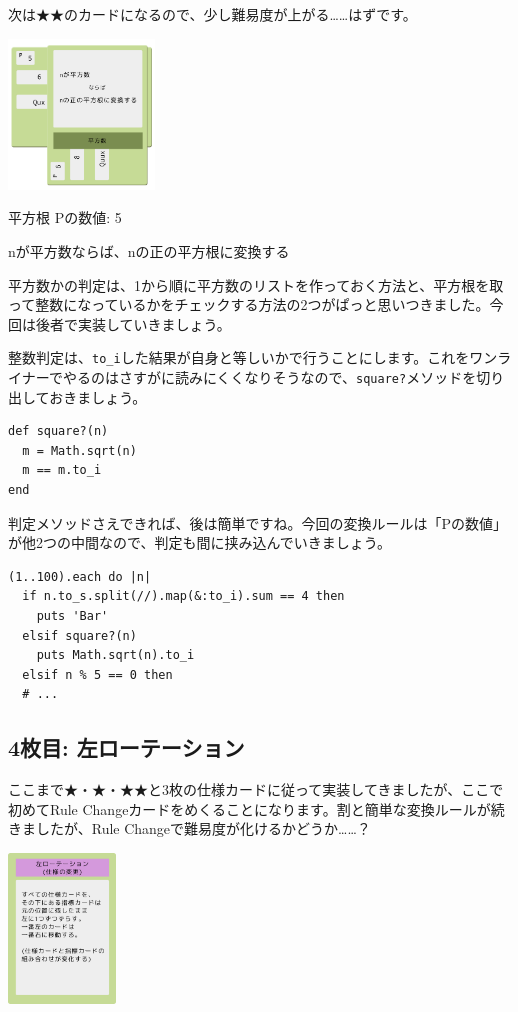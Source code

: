 \documentclass[index]{subfiles}
\begin{document}
次は★★のカードになるので、少し難易度が上がる……はずです。

\begin{center}
  \includegraphics[height=4cm]{image/203_replay_1_3.png}
\end{center}

\begin{itembox}[l]{平方根}
Pの数値: 5

nが平方数ならば、nの正の平方根に変換する
\end{itembox}

平方数かの判定は、1から順に平方数のリストを作っておく方法と、平方根を取って整数になっているかをチェックする方法の2つがぱっと思いつきました。今回は後者で実装していきましょう。

整数判定は、\verb+to_i+した結果が自身と等しいかで行うことにします。これをワンライナーでやるのはさすがに読みにくくなりそうなので、\verb+square?+メソッドを切り出しておきましょう。

\begin{lstlisting}
def square?(n)
  m = Math.sqrt(n)
  m == m.to_i
end
\end{lstlisting}

判定メソッドさえできれば、後は簡単ですね。今回の変換ルールは「Pの数値」が他2つの中間なので、判定も間に挟み込んでいきましょう。

\begin{lstlisting}
(1..100).each do |n|
  if n.to_s.split(//).map(&:to_i).sum == 4 then
    puts 'Bar'
  elsif square?(n)
    puts Math.sqrt(n).to_i
  elsif n % 5 == 0 then
  # ...
\end{lstlisting}

  \subsection{4枚目: 左ローテーション}

ここまで★・★・★★と3枚の仕様カードに従って実装してきましたが、ここで初めてRule Changeカードをめくることになります。割と簡単な変換ルールが続きましたが、Rule Changeで難易度が化けるかどうか……？

\begin{center}
  \includegraphics[height=4cm]{image/204_replay_1_4.png}
\end{center}
\end{document}
